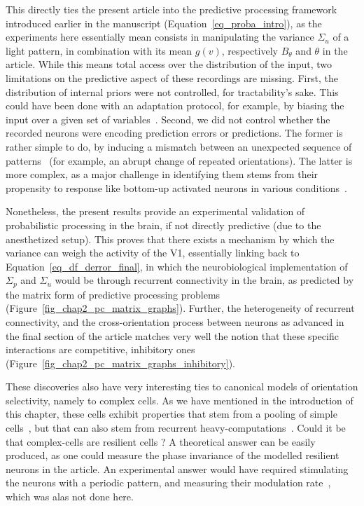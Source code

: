 This directly ties the present article into the predictive processing framework introduced earlier in the manuscript (Equation~\ref{eq_proba_intro}), as the experiments here essentially mean consists in manipulating the variance $\Sigma_u$ of a light pattern, in combination with its mean $g(v)$, respectively $B_\theta$ and $\theta$ in the article. While this means total access over the distribution of the input, two limitations on the predictive aspect of these recordings are missing. First, the distribution of internal priors were not controlled, for tractability's sake. This could have been done with an adaptation protocol, for example, by biasing the input over a given set of variables~\cite{damasse2018reinforcement}. Second, we did not control whether the recorded neurons were encoding prediction errors or predictions. The former is rather simple to do, by inducing a mismatch between an unexpected sequence of patterns~\cite{keller2012sensorimotor} (for example, an abrupt change of repeated orientations). The latter is more complex, as a major challenge in identifying them stems from their propensity to response like bottom-up activated neurons in various conditions~\cite{keller2018predictive}. 

Nonetheless, the present results provide an experimental validation of probabilistic processing in the brain, if not directly predictive (due to the anesthetized setup). This proves that there exists a mechanism by which the variance can weigh the activity of the \gls{V1}, essentially linking back to Equation~\ref{eq_df_derror_final}, in which the neurobiological implementation of $\Sigma_p$ and $\Sigma_u$ would be through recurrent connectivity in the brain, as predicted by the matrix form of predictive processing problems~\cite{bogacz2017tutorial} (Figure~\ref{fig_chap2_pc_matrix_graphs}). Further, the heterogeneity of recurrent connectivity, and the cross-orientation process between neurons as advanced in the final section of the article matches very well the notion that these specific interactions are competitive, inhibitory ones (Figure~\ref{fig_chap2_pc_matrix_graphs_inhibitory}).

These discoveries also have very interesting ties to canonical models of orientation selectivity, namely to complex cells. As we have mentioned in the introduction of this chapter, these cells exhibit properties that stem from a pooling of simple cells~\cite{hubel1962receptive}, but that can also stem from recurrent heavy-computations~\cite{chance1999complex}. Could it be that complex-cells are resilient cells ? A theoretical answer can be easily produced, as one could measure the phase invariance of the modelled resilient neurons in the article. An experimental answer would have required stimulating the neurons with a periodic pattern, and measuring their modulation rate~\cite{skottun1991classifying,ringach2002orientation}, which was alas not done here.

